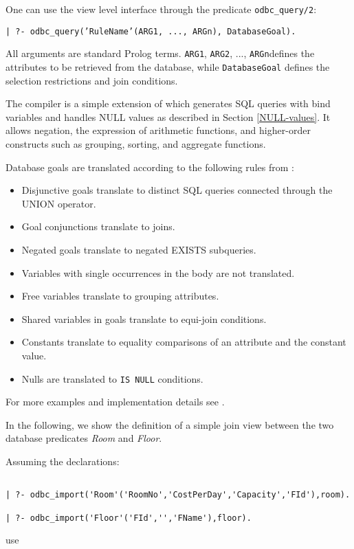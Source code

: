 One can use the view level interface through the predicate {\tt odbc\_query/2}:  
\begin{center}
{\tt | ?- odbc\_query('RuleName'(ARG1, ..., ARGn), DatabaseGoal).}
\end{center}
All arguments are standard Prolog terms.  {\tt ARG1}, {\tt ARG2}, ..., 
{\tt ARGn}defines the attributes to be retrieved from the database, while
{\tt DatabaseGoal} defines the selection restrictions and join conditions.

The compiler is a simple extension of \cite{Drax92} which generates SQL
queries with bind variables and handles NULL values as described in
Section \ref{NULL-values}.  It allows negation, the expression
of arithmetic functions, and higher-order constructs such as grouping,
sorting, and aggregate functions.

Database goals are translated according to the following rules
from \cite{Drax92}:
\begin{itemize}
\item Disjunctive goals translate to distinct SQL queries
	connected through the UNION operator.
\item Goal conjunctions translate to joins.
\item Negated goals translate to negated EXISTS subqueries.
\item Variables with single occurrences in the body are not
	  translated.
\item Free variables translate to grouping attributes.
\item Shared variables in goals translate to equi-join conditions.
\item Constants translate to equality comparisons of an attribute and
	  the constant value.
\item Nulls are translated to {\tt IS NULL} conditions.
\end{itemize}
For more examples and implementation details see \cite{Drax92}.
 
In the following, we show the definition of a simple join view between the 
two database predicates {\it Room} and {\it Floor}.

Assuming the declarations:
\begin{verbatim}

| ?- odbc_import('Room'('RoomNo','CostPerDay','Capacity','FId'),room).

| ?- odbc_import('Floor'('FId','','FName'),floor).
\end{verbatim}

use

